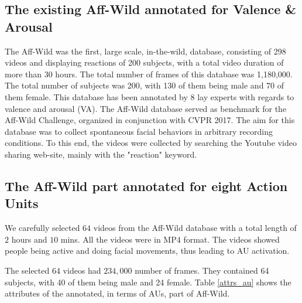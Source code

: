 \documentclass[a4paper, 10pt, conference]{ieeeconf}      %
\begin{document}
\subsection{The existing Aff-Wild annotated for  Valence \& Arousal}


The Aff-Wild was the first, large scale, in-the-wild, database, consisting of 298 videos and displaying reactions
of 200 subjects, with a total video duration of more than 30 hours. The total number of frames of this database was 1,180,000. The total number of subjects was 200, with 130 of them being male and 70 of them female.
This database has been annotated by 8 lay experts with regards to valence and arousal (VA). The Aff-Wild database served as benchmark for the Aff-Wild Challenge, organized in conjunction with CVPR 2017. The aim for this database was to collect spontaneous facial behaviors in arbitrary recording conditions. To
this end, the videos were collected by searching the Youtube video sharing web-site, mainly with the "reaction" keyword. 


\subsection{The Aff-Wild part annotated for eight Action Units}\label{action_unit_section}

\begin{comment}
\begin{figure}
\begin{tabular}{c}
  \texttt{[image: 01\_00001.jpg]}\texttt{[image: 02\_02932.jpg]}\texttt{[image: 03\_00013.jpg]}\texttt{[image: 05\_00063.jpg]}\texttt{[image: 06\_00468.jpg]}\texttt{[image: 07\_00046.jpg]}\texttt{[image: 08\_00148.jpg]}\\
\end{tabular}
\caption{Some representatives of the new database - Part 1}
\label{fig:face_database_1}
\end{figure}
\end{comment}

We carefully selected $64$ videos from the Aff-Wild database with a total length of $2$ hours and $10$ mins. All the videos were in MP4 format. The videos showed people being active and doing facial movements, thus leading to AU activation. 

 The selected 64 videos had $234,000$ number of frames. They contained 64  subjects, with 40 of them being male and 24 female. Table \ref{attrs_au} shows the attributes of the annotated, in terms of AUs, part of Aff-Wild.  
\end{document}
